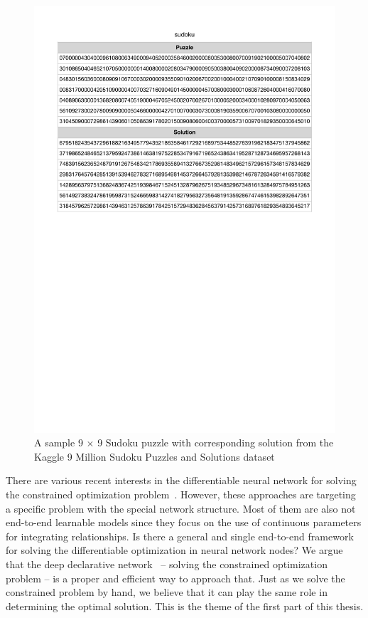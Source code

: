 \begin{figure}[t]
    \label{fig:sudoku-table}
    \centering
    \includegraphics[page=1, width=\textwidth]{figs/sudoku-table.pdf}
    \caption{A sample 9 $\times$ 9 Sudoku puzzle with corresponding solution from the Kaggle 9 Million Sudoku Puzzles and Solutions dataset~\citep{RR:19}}
\end{figure}
\par There are various recent interests in the differentiable neural network for solving the constrained optimization problem~\citep{YF:17, RT:17, WP:19, AB:17}. However, these approaches are targeting a specific problem with the special network structure. Most of them are also not end-to-end learnable models since they focus on the use of continuous parameters for integrating relationships. Is there a general and single end-to-end framework for solving the differentiable optimization in neural network nodes? We argue that the deep declarative network~\citep{SG:19} -- solving the constrained optimization problem -- is a proper and efficient way to approach that. Just as we solve the constrained problem by hand, we believe that it can play the same role in determining the optimal solution. This is the theme of the first part of this thesis. 
